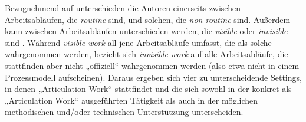 Bezugnehmend auf \citep{Strauss93} unterschieden die Autoren einerseits zwischen Arbeitsabläufen, die \emph{routine} sind, und solchen, die \emph{non-routine} sind. Außerdem kann zwischen Arbeitsabläufen unterschieden werden, die \emph{visible} oder \emph{invisible} sind \citep{Star99}. Während \emph{visible work} all jene Arbeitsabläufe umfasst, die als solche wahrgenommen werden, bezieht sich \emph{invisible work} auf alle Arbeitsabläufe, die stattfinden aber nicht „offiziell“ wahrgenommen werden (also etwa nicht in einem Prozessmodell aufscheinen).  Daraus ergeben sich vier zu unterscheidende Settings, in denen „Articulation Work“ stattfindet und die sich sowohl in der konkret als „Articulation Work“ ausgeführten Tätigkeit als auch in der möglichen methodischen und/oder technischen Unterstützung unterscheiden.

